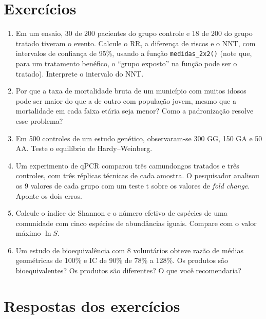 \documentclass[
]{book}
\begin{document}
\section{Exercícios}\label{exercuxedcios-8}

\begin{enumerate}
\def\labelenumi{\arabic{enumi}.}
\item
  Em um ensaio, 30 de 200 pacientes do grupo controle e 18 de 200 do grupo tratado tiveram o evento. Calcule o RR, a diferença de riscos e o NNT, com intervalos de confiança de 95\%, usando a função \texttt{medidas\_2x2()} (note que, para um tratamento benéfico, o ``grupo exposto'' na função pode ser o tratado). Interprete o intervalo do NNT.
\item
  Por que a taxa de mortalidade bruta de um município com muitos idosos pode ser maior do que a de outro com população jovem, mesmo que a mortalidade em cada faixa etária seja menor? Como a padronização resolve esse problema?
\item
  Em 500 controles de um estudo genético, observaram-se 300 GG, 150 GA e 50 AA. Teste o equilíbrio de Hardy--Weinberg.
\item
  Um experimento de qPCR comparou três camundongos tratados e três controles, com três réplicas técnicas de cada amostra. O pesquisador analisou os 9 valores de cada grupo com um teste t sobre os valores de \emph{fold change}. Aponte os dois erros.
\item
  Calcule o índice de Shannon e o número efetivo de espécies de uma comunidade com cinco espécies de abundâncias iguais. Compare com o valor máximo \(\ln S\).
\item
  Um estudo de bioequivalência com 8 voluntários obteve razão de médias geométricas de 100\% e IC de 90\% de 78\% a 128\%. Os produtos são bioequivalentes? Os produtos são diferentes? O que você recomendaria?
\end{enumerate}

\section{Respostas dos exercícios}\label{respostas-dos-exercuxedcios-8}
\end{document}

